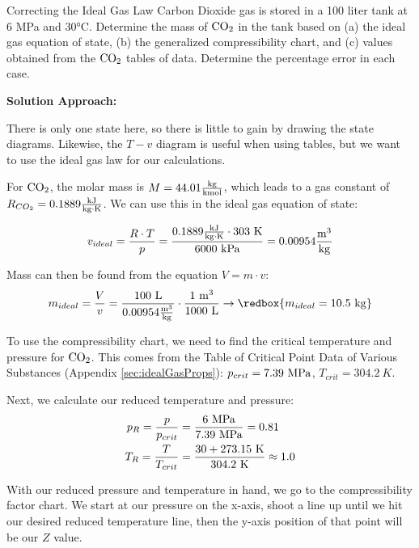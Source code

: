 \begin{example}[label={ex:ch2idealGas}]{Correcting the Ideal Gas Law}
  Carbon Dioxide gas is stored in a 100 liter tank at 6 MPa and 30°C. Determine the mass of $\rm CO_2$ in the tank based on (a) the ideal gas equation of state, (b) the generalized compressibility chart, and (c) values obtained from the $\rm CO_2$ tables of data.  Determine the percentage error in each case.

  {\bf Solution Approach:}

  There is only one state here, so there is little to gain by drawing the state diagrams.  Likewise, the $T-v$ diagram is useful when using tables, but we want to use the ideal gas law for our calculations.

  For $\rm CO_2$, the molar mass is $M = 44.01 \frac{\rm kg}{\rm kmol}$, which leads to a gas constant of $R_{CO_2}=0.1889 \frac{\rm kJ}{\rm kg\cdot K}$.  We can use this in the ideal gas equation of state:

  \begin{equation*}
    v_{ideal} = \frac{R\cdot T}{p} = \frac{0.1889 \frac{\rm kJ}{\rm kg\cdot K} \cdot 303\ {\rm K}}{6000\ {\rm kPa}}= 0.00954 \frac{\rm m^3}{\rm kg}
  \end{equation*}

  Mass can then be found from the equation $V = m \cdot v$:
  \begin{equation*}
    m_{ideal} = \frac{V}{v} = \frac{100\ \rm L}{0.00954 \frac{\rm m^3}{\rm kg}} \cdot \frac{1\ \rm m^3}{1000\ \rm L} \rightarrow \redbox{m_{ideal} = 10.5\ {\rm kg}}
  \end{equation*}
  
  To use the compressibility chart, we need to find the critical temperature and pressure for $\rm CO_2$.  This comes from the Table of Critical Point Data of Various Substances (Appendix \ref{sec:idealGasProps}): $p_{crit} = 7.39\ {\rm MPa}$, $T_{crit} = 304.2\ K$.

  Next, we calculate our reduced temperature and pressure:
  \begin{align*}
    p_R = \frac{p}{p_{crit}} &= \frac{6\rm\ MPa}{7.39\rm\ MPa} = 0.81 \\
    T_R = \frac{T}{T_{crit}} &= \frac{30 + 273.15\rm\ K}{304.2\rm\ K} \approx 1.0 \\
  \end{align*}

With our reduced pressure and temperature in hand, we go to the compressibility factor chart.  We start at our pressure on the x-axis, shoot a line up until we hit our desired reduced temperature line, then the y-axis position of that point will be our $Z$ value.
  

\end{example}
